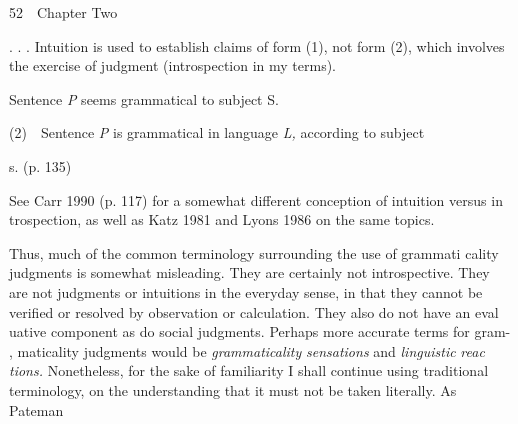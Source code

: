 \clearpage\setcounter{page}{1}\begin{styleStandard}
52\ \ Chapter Two
\end{styleStandard}


\begin{styleStandard}
. . . Intuition is used to establish claims of form (1), not form (2), which involves the exercise of judgment (introspection in my terms).
\end{styleStandard}


\setcounter{listWWNumiileveli}{0}
\begin{listWWNumiileveli}
\item 
\begin{styleStandard}
Sentence \textit{P}\textit{ }seems grammatical to subject S.
\end{styleStandard}


\end{listWWNumiileveli}
\begin{styleStandard}
(2)\ \ Sentence \textit{P}\textit{ }is grammatical in language \textit{L,}\textit{ }according to subject
\end{styleStandard}


\begin{styleStandard}
s. (p. 135)
\end{styleStandard}


\begin{styleStandard}
See Carr 1990 (p. 117) for a somewhat different conception of intuition versus in\- trospection, as well as Katz 1981 and Lyons 1986 on the same topics.
\end{styleStandard}


\begin{styleStandard}
Thus, much of the common terminology surrounding the use of grammati\- cality judgments is somewhat misleading. They are certainly not introspective. They are not judgments or intuitions in the everyday sense, in that they cannot be verified or resolved by observation or calculation. They also do not have an eval\- uative component as do social judgments. Perhaps more accurate terms for gram- , maticality judgments would be \textit{grammaticality}\textit{ }\textit{sensations}\textit{ }and \textit{linguistic}\textit{ }\textit{reac\-}\textit{ }\textit{tions.}\textit{ }Nonetheless, for the sake of familiarity I shall continue using traditional terminology, on the understanding that it must not be taken literally. As Pateman
\end{styleStandard}


